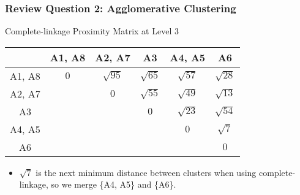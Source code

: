 \documentclass[aspectratio=169, 10pt]{beamer}
\begin{document}
\begin{frame}[t]
    \frametitle{Review Question 2: Agglomerative Clustering}
    \small

    Complete-linkage Proximity Matrix at Level 3

    \begin{table}[]
        \scriptsize
        \begin{tabular}{c|ccccc}
        \cellcolor[HTML]{FFFFFF}{\color[HTML]{000000} } & {\color[HTML]{000000} A1, A8} & {\color[HTML]{000000} A2, A7}      & {\color[HTML]{000000} A3}          & {\color[HTML]{000000} A4, A5}      & {\color[HTML]{000000} A6}          \\ \hline
        {\color[HTML]{000000} A1, A8}                   & {\color[HTML]{000000} $0$}    & {\color[HTML]{000000} $\sqrt{95}$} & {\color[HTML]{000000} $\sqrt{65}$} & {\color[HTML]{000000} $\sqrt{57}$} & {\color[HTML]{000000} $\sqrt{28}$} \\
        {\color[HTML]{000000} A2, A7}                   & {\color[HTML]{000000} }       & {\color[HTML]{000000} $0$}         & {\color[HTML]{000000} $\sqrt{55}$} & {\color[HTML]{000000} $\sqrt{49}$} & {\color[HTML]{000000} $\sqrt{13}$} \\
        {\color[HTML]{000000} A3}                       & {\color[HTML]{000000} }       & {\color[HTML]{000000} }            & {\color[HTML]{000000} $0$}         & {\color[HTML]{000000} $\sqrt{23}$} & {\color[HTML]{000000} $\sqrt{54}$} \\
        {\color[HTML]{000000} A4, A5}                   & {\color[HTML]{000000} }       & {\color[HTML]{000000} }            & {\color[HTML]{000000} }            & {\color[HTML]{000000} $0$}         & {\color[HTML]{fe0000} $\sqrt{7}$}  \\
        {\color[HTML]{000000} A6}                       & {\color[HTML]{000000} }       & {\color[HTML]{000000} }            & {\color[HTML]{000000} }            & {\color[HTML]{000000} }            & {\color[HTML]{000000} $0$}        
        \end{tabular}
    \end{table}

    \begin{itemize}
        \item $\sqrt{7}$ is the next minimum distance between clusters when using complete-linkage, so we merge \{A4, A5\} and \{A6\}.
    \end{itemize}


\end{frame}
\end{document}
